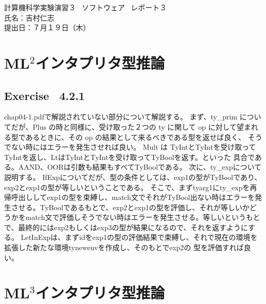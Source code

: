 \documentclass{jreport}
\begin{document}
\begin{center}
  計算機科学実験演習３ \ ソフトウェア \ レポート３  \\
  氏名：吉村仁志  \\
  提出日：７月１９日（木）
  \newpage
\end{center}
\chapter{ML$^2$インタプリタ型推論}
\section{Exercise \ 4.2.1}
chap04-1.pdfで解説されていない部分について解説する。
まず、ty\_prim についてだが、Plus の時と同様に、受け取った２つの ty に関して
op に対して望まれる型であるときに、その op の結果として来るべきである型を返せば良く、
そうでない時にはエラーを発生させれば良い。
Mult は TyIntとTyIntを受け取ってTyIntを返し、LtはTyIntとTyIntを受け取ってTyBoolを返す。といった
具合である。AAND、OORは引数も結果もすべてTyBoolである。
次に、ty\_expについて説明する。
IfExpについてだが、型の条件としては、exp1の型がTyBoolであり、exp2とexp1の型が等しいということである。
そこで、まずtyarg1にty\_expを再帰呼出ししてexp1の型を束縛し、match文でそれがTyBool出ない時はエラーを発生させる。TyBoolであるもとで、exp2とexp1の型を評価し、それが等しいかどうかをmatch文で評価しそうでない時はエラーを発生させる。等しいというもとで、最終的にはexp2もしくはexp3の型が結果になるので、それを返すようにする。
LetInExpは、まずidをexp1の型の評価結果で束縛し、それで現在の環境を拡張した新たな環境tynewenvを作成し、そのもとでexp2の
型を評価すれば良い。
\chapter{ML$^3$インタプリタ型推論}
\end{document}
